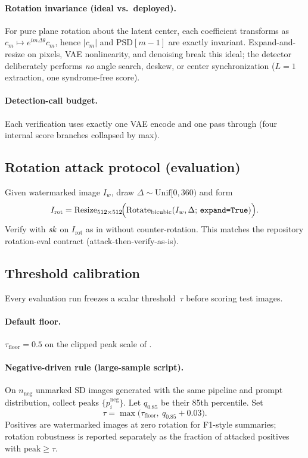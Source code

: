 \paragraph{Rotation invariance (ideal vs.\ deployed).}
For pure plane rotation about the latent center, each coefficient transforms as
\(c_m\mapsto e^{im\Delta\theta}c_m\), hence \(|c_m|\) and \(\mathrm{PSD}[m-1]\) are
exactly invariant.
Expand-and-resize on pixels, VAE nonlinearity, and denoising break this ideal;
the detector deliberately performs \emph{no} angle search, deskew, or center
synchronization (\(L=1\) extraction, one syndrome-free score).

\paragraph{Detection-call budget.}
Each verification uses exactly one VAE encode and one pass through
 (four internal score branches collapsed by max).

\subsection{Rotation attack protocol (evaluation)}
\label{sec:anyangle-rot}

Given watermarked image \(I_w\), draw \(\Delta\sim\mathrm{Unif}[0,360)\) and form
\[
I_{\mathrm{rot}}=
\mathrm{Resize}_{512\times512}\!\Bigl(
\mathrm{Rotate}_{\mathrm{bicubic}}(I_w,\Delta;\,\texttt{expand=True})
\Bigr).
\]
Verify with \(\mathit{sk}\) on \(I_{\mathrm{rot}}\) as in  without
counter-rotation.
This matches the repository rotation-eval contract (attack-then-verify-as-is).

\subsection{Threshold calibration}
\label{sec:anyangle-calib}

Every evaluation run freezes a scalar threshold~\(\tau\) before scoring test images.

\paragraph{Default floor.}
\(\tau_{\mathrm{floor}}=0.5\) on the clipped peak scale of .

\paragraph{Negative-driven rule (large-sample script).}
On \(n_{\mathrm{neg}}\) unmarked SD images generated with the same pipeline and prompt
distribution, collect peaks \(\{p_i^{\mathrm{neg}}\}\).
Let \(q_{0.85}\) be their 85th percentile.
Set
\[
\tau=\max\bigl(\tau_{\mathrm{floor}},\ q_{0.85}+0.03\bigr).
\]
Positives are watermarked images at zero rotation for F1-style summaries; rotation
robustness is reported separately as the fraction of attacked positives with
\(\mathrm{peak}\ge\tau\).


